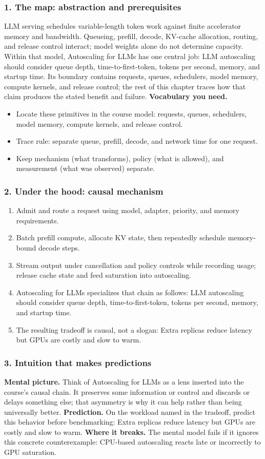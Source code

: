 \subsubsection*{1. The map: abstraction and prerequisites}
LLM serving schedules variable-length token work against finite accelerator memory and bandwidth. Queueing, prefill, decode, KV-cache allocation, routing, and release control interact; model weights alone do not determine capacity.
Within that model, Autoscaling for LLMs has one central job: LLM autoscaling should consider queue depth, time-to-first-token, tokens per second, memory, and startup time. Its boundary contains requests, queues, schedulers, model memory, compute kernels, and release control; the rest of this chapter traces how that claim produces the stated benefit and failure.
\textbf{Vocabulary you need.}\begin{itemize}
\item Locate these primitives in the course model: requests, queues, schedulers, model memory, compute kernels, and release control.
\item Trace rule: separate queue, prefill, decode, and network time for one request.
\item Keep mechanism (what transforms), policy (what is allowed), and measurement (what was observed) separate.
\end{itemize}
\subsubsection*{2. Under the hood: causal mechanism}\begin{enumerate}
\item Admit and route a request using model, adapter, priority, and memory requirements.
\item Batch prefill compute, allocate KV state, then repeatedly schedule memory-bound decode steps.
\item Stream output under cancellation and policy controls while recording usage; release cache state and feed saturation into autoscaling.
\item Autoscaling for LLMs specializes that chain as follows: LLM autoscaling should consider queue depth, time-to-first-token, tokens per second, memory, and startup time.
\item The resulting tradeoff is causal, not a slogan: Extra replicas reduce latency but GPUs are costly and slow to warm.
\end{enumerate}
\subsubsection*{3. Intuition that makes predictions}
\textbf{Mental picture.} Think of Autoscaling for LLMs as a lens inserted into the course's causal chain. It preserves some information or control and discards or delays something else; that asymmetry is why it can help rather than being universally better.
\textbf{Prediction.} On the workload named in the tradeoff, predict this behavior before benchmarking: Extra replicas reduce latency but GPUs are costly and slow to warm.
\textbf{Where it breaks.} The mental model fails if it ignores this concrete counterexample: CPU-based autoscaling reacts late or incorrectly to GPU saturation.
